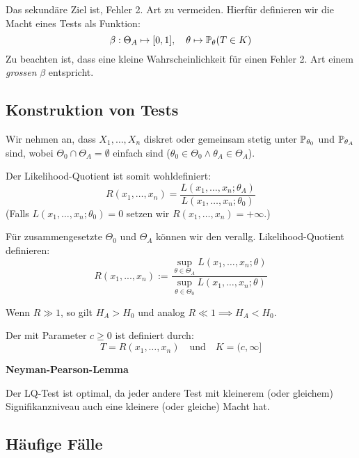 Das sekundäre Ziel ist, Fehler 2. Art zu vermeiden. Hierfür definieren wir die Macht eines Tests als Funktion:
\[\beta : \Theta_A \mapsto [0,1], \quad \theta \mapsto \P_\theta(T \in K)\]
Zu beachten ist, dass eine kleine Wahrscheinlichkeit für einen Fehler 2. Art einem \textit{grossen} \(\beta\) entspricht.

\subsection{Konstruktion von Tests}
Wir nehmen an, dass \(X_1, \ldots, X_n\) diskret oder gemeinsam stetig unter \(\P_{\theta_0}\) und \(\P_{\theta_A}\) sind, wobei \(\Theta_0 \cap \Theta_A = \emptyset\) einfach sind (\(\theta_0 \in \Theta_0 \land \theta_A \in \Theta_A\)).

\noindent Der Likelihood-Quotient ist somit wohldefiniert:
\[R(x_1, \ldots, x_n) = \frac{L(x_1,\ldots, x_n;\theta_A)}{L(x_1, \ldots, x_n;\theta_0)}\]
(Falls \(L(x_1, \ldots, x_n; \theta_0) = 0\) setzen wir \(R(x_1, \ldots, x_n) = +\infty\).) 

Für zusammengesetzte $\Theta_0$ und $\Theta_A$ können wir den verallg. Likelihood-Quotient definieren:
\[R(x_1, ..., x_n) := \frac{\sup_{\theta \in \Theta_A}L(x_1, \dots, x_n; \theta)}{\sup_{\theta \in \Theta_0}L(x_1, \dots, x_n; \theta)}\]


Wenn \(R \gg 1\), so gilt \(H_A > H_0\) und analog \(R \ll 1 \implies H_A < H_0\).

\begin{subbox}{}
	Der  mit Parameter \(c \ge 0\) ist definiert durch:
	\[T = R(x_1, \ldots, x_n) \quad \text{und} \quad K = (c, \infty]\]
\end{subbox}
\textbf{Neyman-Pearson-Lemma}

Der LQ-Test ist optimal, da jeder andere Test mit kleinerem (oder gleichem) Signifikanzniveau auch eine kleinere (oder gleiche) Macht hat.

\subsection{Häufige Fälle}
